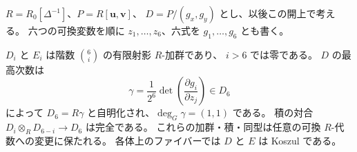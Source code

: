 $R=R_0[\Delta^{-1}]$、$P=R[\mathbf u,\mathbf v]$、
$D=P/(g_x,g_y)$ とし、以後この開上で考える。
六つの可換変数を順に $z_1,\ldots,z_6$、六式を $g_1,\ldots,g_6$ とも書く。

\begin{lemma}
\label{ifb:lem:relative-ci}
$D_i$ と $E_i$ は階数 $\binom6i$ の有限射影 $R$-加群であり、
$i>6$ では零である。
$D$ の最高次数は
\begin{equation}\label{ifb:eq:jacobian-orientation}
 \gamma=\frac1{2^6}
           \det\left(\frac{\partial g_i}{\partial z_j}\right)
                   \in D_6
\end{equation}
によって $D_6=R\gamma$ と自明化され、$\deg_G\gamma=(1,1)$ である。
積の対合 $D_i\otimes_RD_{6-i}\to D_6$ は完全である。
これらの加群・積・同型は任意の可換 $R$-代数への変更に保たれる。
各体上のファイバーでは $D$ と $E$ は Koszul である。
\end{lemma}

